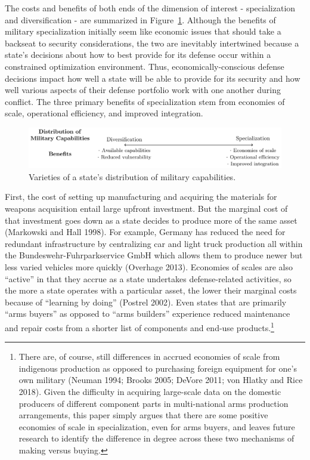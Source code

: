 \documentclass[
  12,
  letterpaper,
  DIV=11,
  numbers=noendperiod]{scrartcl}
\begin{document}
The costs and benefits of both ends of the dimension of interest -
specialization and diversification - are summarized in
Figure~\ref{fig-spectrum_specialization}. Although the benefits of
military specialization initially seem like economic issues that should
take a backseat to security considerations, the two are inevitably
intertwined because a state's decisions about how to best provide for
its defense occur within a constrained optimization environment. Thus,
economically-conscious defense decisions impact how well a state will be
able to provide for its security and how well various aspects of their
defense portfolio work with one another during conflict. The three
primary benefits of specialization stem from economies of scale,
operational efficiency, and improved integration.

\begin{figure}

{\centering \includegraphics{2023-07-13_Specialization_files/figure-pdf/fig-spectrum_specialization-1.png}

}

\caption{\label{fig-spectrum_specialization}Varieties of a state's
distribution of military capabilities.}

\end{figure}

First, the cost of setting up manufacturing and acquiring the materials
for weapons acquisition entail large upfront investment. But the
marginal cost of that investment goes down as a state decides to produce
more of the same asset (Markowski and Hall 1998). For example, Germany
has reduced the need for redundant infrastructure by centralizing car
and light truck production all within the Bundeswehr-Fuhrparkservice
GmbH which allows them to produce newer but less varied vehicles more
quickly (Overhage 2013). Economies of scales are also ``active'' in that
they accrue as a state undertakes defense-related activities, so the
more a state operates with a particular asset, the lower their marginal
costs because of ``learning by doing'' (Postrel 2002). Even states that
are primarily ``arms buyers'' as opposed to ``arms builders'' experience
reduced maintenance and repair costs from a shorter list of components
and end-use products.\footnote{There are, of course, still differences
  in accrued economies of scale from indigenous production as opposed to
  purchasing foreign equipment for one's own military (Neuman 1994;
  Brooks 2005; DeVore 2011; von Hlatky and Rice 2018). Given the
  difficulty in acquiring large-scale data on the domestic producers of
  different component parts in multi-national arms production
  arrangements, this paper simply argues that there are some positive
  economies of scale in specialization, even for arms buyers, and leaves
  future research to identify the difference in degree across these two
  mechanisms of making versus buying.}
\end{document}
